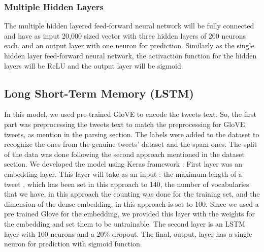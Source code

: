 \subsubsection{Multiple Hidden Layers} The multiple hidden layered
feed-forward neural network will be fully connected and have as input
20,000 sized vector with three hidden layers of 200 neurons each, and
an output layer with one neuron for prediction. Similarly as the
single hidden layer feed-forward neural network, the activaction
function for the hidden layers will be ReLU and the output layer will
be sigmoid.

\subsection{Long Short-Term Memory (LSTM)}
In this model, we used pre-trained GloVE to encode the tweets text. So, the first part was preprocessing the tweets text to match the preprocessing for GloVE tweets, as mention in the parsing section. The labels were added to the dataset to recognize the ones from the genuine tweets’ dataset and the spam ones. The split of the data was done following the second approach mentioned in the dataset section. We developed the model using Keras framework  \citep{chollet2015keras}:
First layer was an embedding layer. This layer will take as an input : the maximum length of a tweet , which has been set in this approach to 140, the number of vocabularies that we have, in this approach the counting was done for the training set, and the dimension of the dense embedding, in this approach is set to 100. Since we used a pre trained Glove for the embedding, we provided this layer with the weights for the embedding and set them to be untrainable. 
The second layer is an LSTM layer with 100 neurons and a 20\% dropout. 
The final, output, layer has a single neuron for prediction with sigmoid function.



